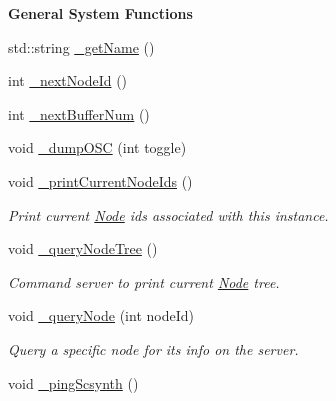 \begin{Indent}{\bf General System Functions}\par
\begin{DoxyCompactItemize}
\item 
std\-::string \hyperlink{classColliderPlusPlus_1_1Client__Server_ac2f5c4bddaf2bbd6a7ab15c8c42163e7}{\-\_\-get\-Name} ()
\item 
int \hyperlink{classColliderPlusPlus_1_1Client__Server_aef5ff53324f90cae73b5a23f560e6cb7}{\-\_\-next\-Node\-Id} ()
\item 
int \hyperlink{classColliderPlusPlus_1_1Client__Server_a5f39e21b7834a06568250cce4cafae3c}{\-\_\-next\-Buffer\-Num} ()
\item 
void \hyperlink{classColliderPlusPlus_1_1Client__Server_a52205c38d60f01ecacb7d933f4755c02}{\-\_\-dump\-O\-S\-C} (int toggle)
\item 
\hypertarget{classColliderPlusPlus_1_1Client__Server_a0e48411b1875280bed41a8d5011c1a7e}{void \hyperlink{classColliderPlusPlus_1_1Client__Server_a0e48411b1875280bed41a8d5011c1a7e}{\-\_\-print\-Current\-Node\-Ids} ()}\label{classColliderPlusPlus_1_1Client__Server_a0e48411b1875280bed41a8d5011c1a7e}

\begin{DoxyCompactList}\small\item\em Print current \hyperlink{classColliderPlusPlus_1_1Node}{Node} ids associated with this instance. \end{DoxyCompactList}\item 
\hypertarget{classColliderPlusPlus_1_1Client__Server_ac71996de28e349d32bc5d6aef07524ac}{void \hyperlink{classColliderPlusPlus_1_1Client__Server_ac71996de28e349d32bc5d6aef07524ac}{\-\_\-query\-Node\-Tree} ()}\label{classColliderPlusPlus_1_1Client__Server_ac71996de28e349d32bc5d6aef07524ac}

\begin{DoxyCompactList}\small\item\em Command server to print current \hyperlink{classColliderPlusPlus_1_1Node}{Node} tree. \end{DoxyCompactList}\item 
\hypertarget{classColliderPlusPlus_1_1Client__Server_aa7b293e8b9e4b75a46d78a169962a243}{void \hyperlink{classColliderPlusPlus_1_1Client__Server_aa7b293e8b9e4b75a46d78a169962a243}{\-\_\-query\-Node} (int node\-Id)}\label{classColliderPlusPlus_1_1Client__Server_aa7b293e8b9e4b75a46d78a169962a243}

\begin{DoxyCompactList}\small\item\em Query a specific node for its info on the server. \end{DoxyCompactList}\item 
\hypertarget{classColliderPlusPlus_1_1Client__Server_a49d7fa9a360a1fe8b32b9cabc8e4fafc}{void \hyperlink{classColliderPlusPlus_1_1Client__Server_a49d7fa9a360a1fe8b32b9cabc8e4fafc}{\-\_\-ping\-Scsynth} ()}\label{classColliderPlusPlus_1_1Client__Server_a49d7fa9a360a1fe8b32b9cabc8e4fafc}


\end{DoxyCompactItemize}
\end{Indent}
